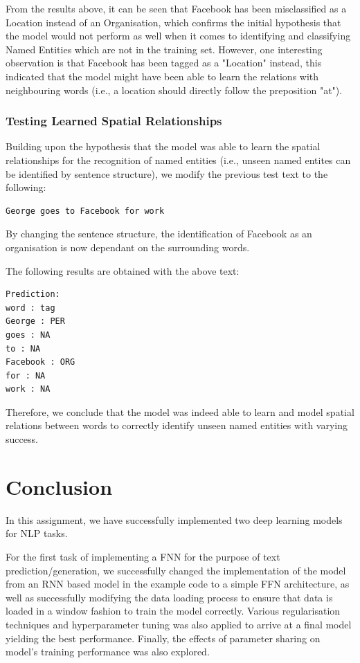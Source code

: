 \documentclass[sigconf,nonacm=true]{acmart}
\begin{document}
From the results above, it can be seen that Facebook has been misclassified as a Location instead of an Organisation, which confirms the initial hypothesis that the model would not perform as well when it comes to identifying and classifying Named Entities which are not in the training set. However, one interesting observation is that Facebook has been tagged as a "Location" instead, this indicated that the model might have been able to learn the relations with neighbouring words (i.e., a location should directly follow the preposition "at").

\subsubsection{Testing Learned Spatial Relationships}

Building upon the hypothesis that the model was able to learn the spatial relationships for the recognition of named entities (i.e., unseen named entites can be identified by sentence structure), we modify the previous test text to the following: 

\begin{lstlisting}
George goes to Facebook for work
\end{lstlisting}

By changing the sentence structure, the identification of Facebook as an organisation is now dependant on the surrounding words. 

The following results are obtained with the above text:
\begin{lstlisting}
Prediction:
word : tag
George : PER
goes : NA
to : NA
Facebook : ORG
for : NA
work : NA
\end{lstlisting}

Therefore, we conclude that the model was indeed able to learn and model spatial relations between words to correctly identify unseen named entities with varying success. 

\section{Conclusion}
In this assignment, we have successfully implemented two deep learning models for NLP tasks. 

For the first task of implementing a FNN for the purpose of text prediction/generation, we successfully changed the implementation of the model from an RNN based model in the example code to a simple FFN architecture, as well as successfully modifying the data loading process to ensure that data is loaded in a window fashion to train the model correctly. Various regularisation techniques and hyperparameter tuning was also applied to arrive at a final model yielding the best performance. Finally, the effects of parameter sharing on model's training performance was also explored.
\end{document}
